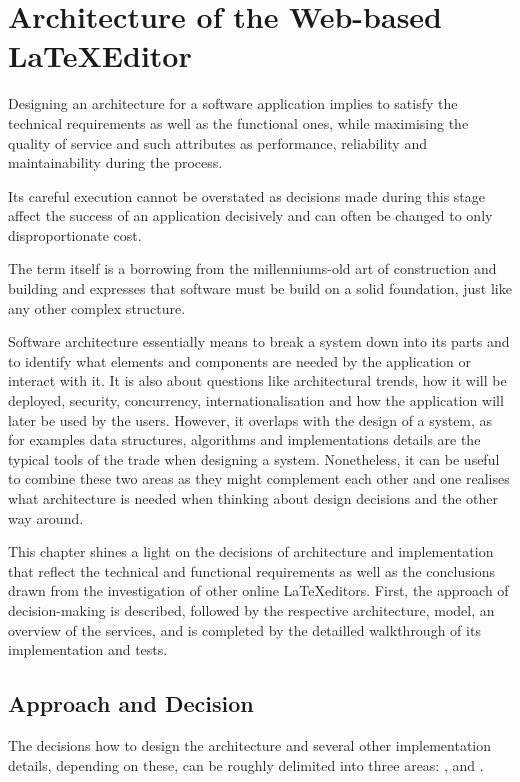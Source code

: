 \chapter{Architecture of the Web-based \LaTeX Editor}
\label{chap:architecture}
Designing an architecture for a software application implies to satisfy the technical requirements as well as the functional ones, while maximising the quality of service and such attributes as performance, reliability and maintainability during the process. 
 
Its careful execution cannot be overstated as decisions made during this stage affect the success of an application decisively and can often be changed to only disproportionate cost.

The term itself is a borrowing from the millenniums-old art of construction and building and expresses that software must be build on a solid foundation, just like any other complex structure.

Software architecture essentially means to break a system down into its parts and to identify what elements and components are needed by the application or interact with it. It is also about questions like architectural trends, how it will be deployed, security, concurrency, internationalisation and how the application will later be used by the users. However, it overlaps with the design of a system, as for examples data structures, algorithms and implementations details are the typical tools of the trade when designing a system. Nonetheless, it can be useful to combine these two areas as they might complement each other and one realises what architecture is needed when thinking about design decisions and the other way around.

This chapter shines a light on the decisions of architecture and implementation that reflect the technical and functional requirements as well as the conclusions drawn from the investigation of other online \LaTeX editors. First, the approach of decision-making is described, followed by the respective architecture, model, an overview of the services, and is completed by the detailled walkthrough of its implementation and tests.

\section{Approach and Decision}
\label{sec:approach-and-decision}
The decisions how to design the architecture and several other implementation details, depending on these, can be roughly delimited into three areas: ,  and .

